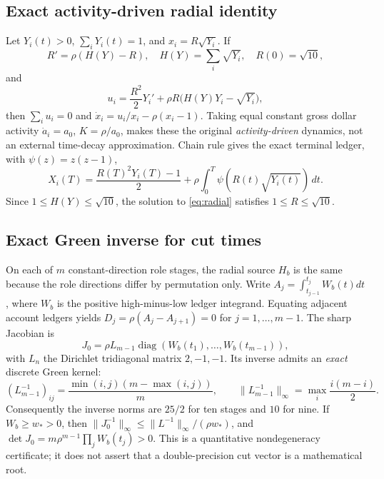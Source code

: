 \documentclass[review,hidelinks,onefignum,onetabnum]{siamonline250211}%
\begin{document}
\subsection{Exact activity-driven radial identity}
Let $Y_i(t)>0$, $\sum_iY_i(t)=1$, and $x_i=R\sqrt{Y_i}$.
If
\begin{equation}\label{eq:radial}
 R'=\rho(H(Y)-R),\quad H(Y)=\sum_i\sqrt{Y_i},\quad
 R(0)=\sqrt{10},
\end{equation}
and
\begin{equation}\label{eq:rateformula}
 u_i=\frac{R^2}{2}Y_i'
    +\rho R\bigl(H(Y)Y_i-\sqrt{Y_i}\bigr),
\end{equation}
then $\sum_i u_i=0$ and
$\dot x_i=u_i/x_i-\rho(x_i-1)$. Taking equal constant gross
dollar activity $\dot a_i=a_0$, $K=\rho/a_0$, makes these
the original \emph{activity-driven} dynamics, not an external
time-decay approximation. Chain rule gives the exact terminal
ledger, with $\psi(z)=z(z-1)$,
\begin{equation}\label{eq:ledgerradial}
 X_i(T)=\frac{R(T)^2Y_i(T)-1}{2}
             +\rho\int_0^T\psi(R(t)\sqrt{Y_i(t)})\,dt.
\end{equation}
Since $1\le H(Y)\le\sqrt{10}$, the solution to
\eqref{eq:radial} satisfies $1\le R\le\sqrt{10}$.

\subsection{Exact Green inverse for cut times}
On each of $m$ constant-direction role stages, the radial source
$H_b$ is the same because the role directions differ by
permutation only. Write
$A_j=\int_{t_{j-1}}^{t_j}W_b(t)dt$,
where $W_b$ is the positive high-minus-low ledger integrand.
Equating adjacent account ledgers yields
$D_j=\rho(A_j-A_{j+1})=0$ for $j=1,\dots,m-1$.
The sharp Jacobian is
\begin{equation}\label{eq:sharpJ}
 J_0=\rho L_{m-1}\operatorname{diag}(W_b(t_1),\dots,W_b(t_{m-1})),
\end{equation}
with $L_n$ the Dirichlet tridiagonal matrix $2,-1,-1$.
Its inverse admits an \emph{exact} discrete Green kernel:
\[
 (L_{m-1}^{-1})_{ij}=
 \frac{\min(i,j)(m-\max(i,j))}{m},
 \qquad \|L_{m-1}^{-1}\|_\infty
 =\max_i\frac{i(m-i)}2.
\]
Consequently the inverse norms are $25/2$ for ten stages
and $10$ for nine. If $W_b\ge w_*>0$, then
$\|J_0^{-1}\|_\infty\le\|L^{-1}\|_\infty/(\rho w_*)$,
and $\det J_0=m\rho^{m-1}\prod_jW_b(t_j)>0$.
This is a quantitative nondegeneracy certificate; it does not
assert that a double-precision cut vector is a mathematical root.
\end{document}
